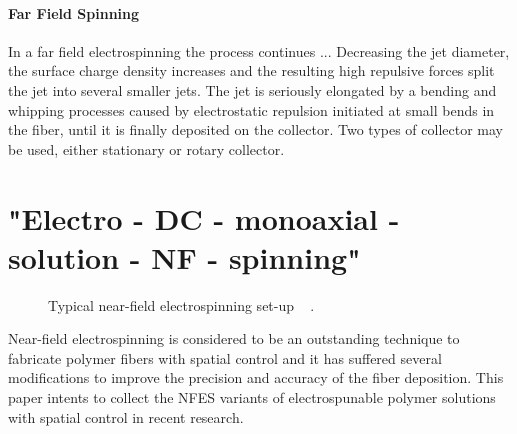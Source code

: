 \documentclass[5p,,preprint,12pt,twocolumn]{elsarticle}
\makeatletter
\def\fixFloatSize#1{}%
\makeatother
\begin{document}
\paragraph{Far Field Spinning}In  a far field electrospinning the process continues ... Decreasing the jet diameter, the surface charge density increases and the resulting high repulsive forces split the jet into several smaller jets. The jet is seriously elongated by a bending and whipping processes caused by electrostatic repulsion initiated at small bends in the fiber, until it is finally deposited on the collector. Two types of collector may be used, either stationary or rotary collector.
    
\section{"Electro - DC - monoaxial - solution - NF - spinning"}

\bgroup
\fixFloatSize{images/397f8131-9380-45a0-8289-a666e0d4f8c6-udrf_nfes.jpg}
\begin{figure}[!htbp]
\centering \makeatletter{}
\makeatother 
\caption{{Typical near-field electrospinning set-up \unskip~\protect\cite{527120:11973130} .}}
\label{f-fe28447572e9}
\end{figure}
\egroup
Near-field electrospinning is considered to be an outstanding technique to fabricate polymer fibers with spatial control and it has suffered several modifications to improve the precision and accuracy of the fiber deposition. This paper intents to collect the NFES variants of electrospunable polymer solutions with spatial control in recent research.
    
\end{document}
